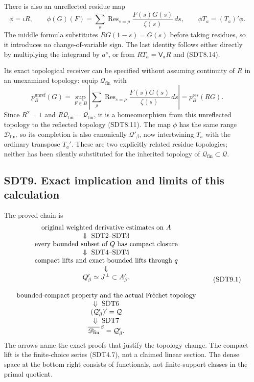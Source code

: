 There is also an unreflected residue map \[
\phi=\iota R,\qquad
\phi(G)(F)=\sum_\rho\operatorname{Res}_{s=\rho}
\frac{F(s)G(s)}{\zeta(s)}\,ds,\qquad
\phi T_a=(T_a)'\phi.
\tag{SDT8.15}
\] The middle formula substitutes \(RG(1-s)=G(s)\) before taking
residues, so it introduces no change-of-variable sign. The last identity
follows either directly by multiplying the integrand by \(a^s\), or from
\(RT_a=\mathsf V_aR\) and (SDT8.14).

Its exact topological receiver can be specified without assuming
continuity of \(R\) in an unexamined topology: equip
\(\mathcal Q_{\mathrm{fin}}\) with \[
p_B^{\mathrm{unref}}(G)
=\sup_{F\in B}\left|
\sum_\rho\operatorname{Res}_{s=\rho}
\frac{F(s)G(s)}{\zeta(s)}\,ds\right|
=p_B^{\mathrm{res}}(RG).
\tag{SDT8.16}
\] Since \(R^2=1\) and
\(R\mathcal Q_{\mathrm{fin}}=\mathcal Q_{\mathrm{fin}}\), it is a
homeomorphism from this unreflected topology to the reflected topology
(SDT8.11). The map \(\phi\) has the same range
\(\mathscr D_{\mathrm{fin}}\), so its completion is also canonically
\(\mathcal Q'_\beta\), now intertwining \(T_a\) with the ordinary
transpose \(T_a'\). These are two explicitly related residue topologies;
neither has been silently substituted for the inherited topology of
\(\mathcal Q_{\mathrm{fin}}\subset\mathcal Q\).

\subsection{SDT9. Exact implication and limits of this
calculation}\label{sdt9.-exact-implication-and-limits-of-this-calculation}

The proved chain is \[
\begin{gathered}
\begin{array}{c}
\text{original weighted derivative estimates on }A\\
\Downarrow\ {\rm SDT2\text{--}SDT3}\\
\text{every bounded subset of }Q\text{ has compact closure}\\
\Downarrow\ {\rm SDT4\text{--}SDT5}\\
\text{compact lifts and exact bounded lifts through }q\\
\Downarrow\\
Q'_\beta\simeq J^\perp\subset A'_\beta,
\end{array}\\[1em]
\begin{array}{c}
\text{bounded-compact property and the actual Fréchet topology}\\
\Downarrow\ {\rm SDT6}\\
(\mathcal Q'_\beta)'=\mathcal Q\\
\Downarrow\ {\rm SDT7}\\
\overline{\mathscr D_{\rm fin}}^{\,\beta}=\mathcal Q'_\beta.
\end{array}
\end{gathered}
\tag{SDT9.1}
\] The arrows name the exact proofs that justify the topology change.
The compact lift is the finite-choice series (SDT4.7), not a claimed
linear section. The dense space at the bottom right consists of
functionals, not finite-support classes in the primal quotient.

